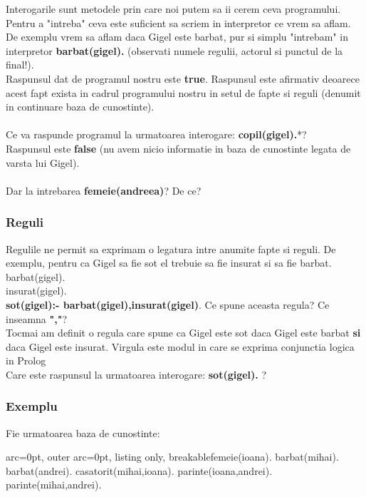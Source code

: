 Interogarile sunt metodele prin care noi putem sa ii cerem ceva programului. Pentru a "intreba" ceva este suficient sa scriem in interpretor ce vrem sa aflam. \\De exemplu vrem sa aflam daca Gigel este barbat, pur si simplu "intrebam" in interpretor \textbf{barbat(gigel).} (observati numele regulii, actorul si punctul de la final!).\\Raspunsul dat de programul nostru este \textbf{true}.  Raspunsul este afirmativ deoarece acest fapt exista in cadrul programului nostru in setul de fapte si reguli (denumit in continuare baza de cunostinte). \\\\Ce va raspunde programul la urmatoarea interogare: \textbf{copil(gigel).}*? \\Raspunsul este \textbf{false} (nu avem nicio informatie in baza de cunostinte legata de varsta lui Gigel). \\\\Dar la intrebarea \textbf{femeie(andreea)}? De ce?\\
\subsubsection*{ Reguli }

Regulile ne permit sa exprimam o legatura intre anumite fapte si reguli. De exemplu, pentru ca Gigel sa fie sot el trebuie sa fie insurat si sa fie barbat.\\barbat(gigel).\\insurat(gigel).\\\textbf{sot(gigel):- barbat(gigel),insurat(gigel)}. Ce spune aceasta regula? Ce inseamna \textbf{","}? \\Tocmai am definit o regula care spune ca Gigel este sot daca Gigel este barbat \textbf{si} daca Gigel este insurat. Virgula este modul in care se exprima conjunctia logica in Prolog \\Care este raspunsul la urmatoarea interogare: \textbf{sot(gigel).} ?

\subsubsection*{ Exemplu }
Fie urmatoarea baza de cunostinte:
\begin{tcblisting}{arc=0pt, outer arc=0pt, listing only, breakable}femeie(ioana).
barbat(mihai).
barbat(andrei). 
casatorit(mihai,ioana).
parinte(ioana,andrei).
parinte(mihai,andrei).
\end{tcblisting}

